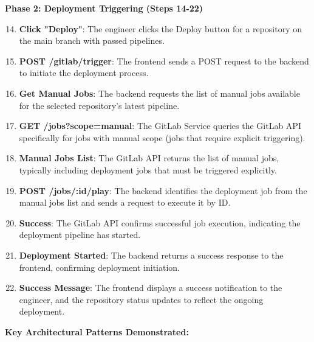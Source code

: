\textbf{Phase 2: Deployment Triggering (Steps 14-22)}

\begin{enumerate}
    \setcounter{enumi}{13}
    \item \textbf{Click "Deploy"}: The engineer clicks the Deploy button for a repository on the main branch with passed pipelines.
    
    \item \textbf{POST /gitlab/trigger}: The frontend sends a POST request to the backend to initiate the deployment process.
    
    \item \textbf{Get Manual Jobs}: The backend requests the list of manual jobs available for the selected repository's latest pipeline.
    
    \item \textbf{GET /jobs?scope=manual}: The GitLab Service queries the GitLab API specifically for jobs with manual scope (jobs that require explicit triggering).
    
    \item \textbf{Manual Jobs List}: The GitLab API returns the list of manual jobs, typically including deployment jobs that must be triggered explicitly.
    
    \item \textbf{POST /jobs/:id/play}: The backend identifies the deployment job from the manual jobs list and sends a request to execute it by ID.
    
    \item \textbf{Success}: The GitLab API confirms successful job execution, indicating the deployment pipeline has started.
    
    \item \textbf{Deployment Started}: The backend returns a success response to the frontend, confirming deployment initiation.
    
    \item \textbf{Success Message}: The frontend displays a success notification to the engineer, and the repository status updates to reflect the ongoing deployment.
\end{enumerate}

\textbf{Key Architectural Patterns Demonstrated:}

